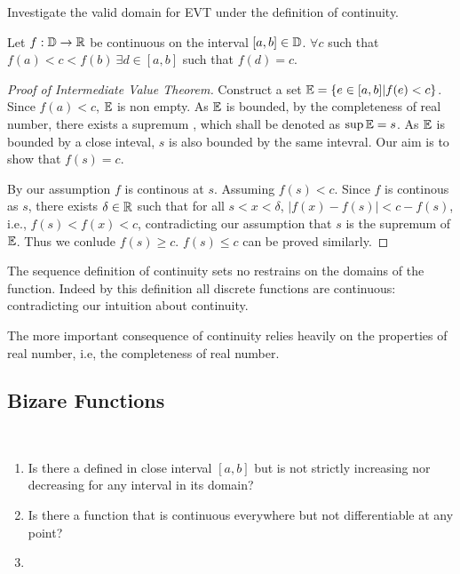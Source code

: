\documentclass[../note.tex]{subfiles}
\begin{document}
\begin{hypothesis}
	Investigate the valid domain for EVT under the definition of continuity. 
\end{hypothesis}

\begin{theorem}
	Let $f: \mathbb{D} \rightarrow \mathbb{R}$ be continuous on the interval $[a,b]\in \mathbb{D}$. $\forall c $ such that $f(a)<c<f(b)\ \exists d \in [a,b] $ such that $ f(d) = c$.  
\end{theorem}

\begin{proof}[Proof of Intermediate Value Theorem]
	Construct a set $\mathbb{E} = \{e\in [a,b]| f(e)<c\}$. Since $f(a)<c$, $\mathbb{E}$ is non empty.  
	As $\mathbb{E}$ is bounded, by the completeness of real number, there exists a supremum , which shall be denoted as $\sup{\mathbb{E}}=s$. 
	As $\mathbb{E}$ is bounded by a close inteval, $s$ is also bounded by the same intevral. Our aim is to show that $f(s)=c$.

	By our assumption $f$ is continous at $s$. Assuming $f(s) < c$. 
	Since $f$ is continous as $s$, there exists $\delta \in \mathbb{R}$ such that for all $s<x<\delta$, $|f(x)-f(s)|<c-f(s)$, i.e., $f(s)<f(x)<c$, contradicting our assumption that $s$ is the supremum of $\mathbb{E}$. 
	Thus we conlude $f(s)\geq c$. $f(s)\leq c$ can be proved similarly.
\end{proof}

\begin{remark}
	The sequence definition of continuity sets no restrains on the domains of the function. Indeed by this definition all discrete functions are continuous: contradicting our intuition about continuity.
	
	The more important consequence of continuity relies heavily on the properties of real number, i.e, the completeness of real number.
\end{remark}

\subsection{Bizare Functions}
\begin{hypothesis}
	\ 
\begin{enumerate}
	\item Is there a defined in close interval $[a,b]$ but is not strictly increasing nor decreasing for any interval in its domain? 
	\item Is there a function that is continuous everywhere but not differentiable at any point?
	\item  
\end{enumerate}
\end{hypothesis}
\end{document}
